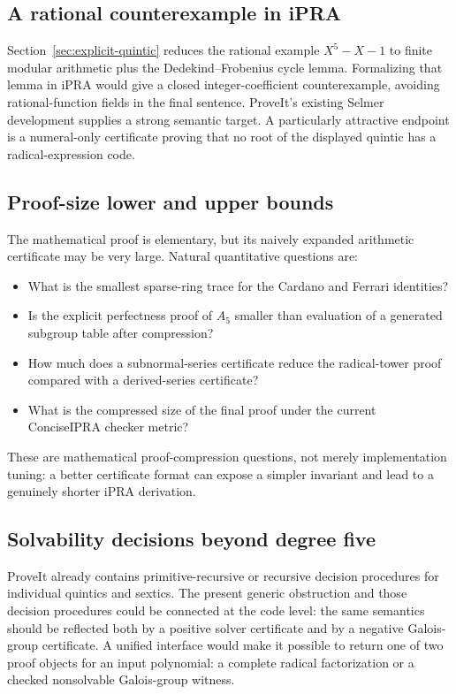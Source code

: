 \subsection{A rational counterexample in iPRA}

Section~\ref{sec:explicit-quintic} reduces the rational example
$X^5-X-1$ to finite modular arithmetic plus the Dedekind--Frobenius cycle
lemma.  Formalizing that lemma in iPRA would give a closed integer-coefficient
counterexample, avoiding rational-function fields in the final sentence.
ProveIt's existing Selmer development supplies a strong semantic target.  A
particularly attractive endpoint is a numeral-only certificate proving that
no root of the displayed quintic has a radical-expression code.

\subsection{Proof-size lower and upper bounds}

The mathematical proof is elementary, but its naively expanded arithmetic
certificate may be very large.  Natural quantitative questions are:

\begin{itemize}
\item What is the smallest sparse-ring trace for the Cardano and Ferrari
  identities?
\item Is the explicit perfectness proof of $A_5$ smaller than evaluation of a
  generated subgroup table after compression?
\item How much does a subnormal-series certificate reduce the radical-tower
  proof compared with a derived-series certificate?
\item What is the compressed size of the final proof under the current
  ConciseIPRA checker metric?
\end{itemize}

These are mathematical proof-compression questions, not merely implementation
tuning: a better certificate format can expose a simpler invariant and lead to
a genuinely shorter iPRA derivation.

\subsection{Solvability decisions beyond degree five}

ProveIt already contains primitive-recursive or recursive decision procedures
for individual quintics and sextics.  The present generic obstruction and
those decision procedures could be connected at the code level: the same
 semantics should be reflected both by a positive
solver certificate and by a negative Galois-group certificate.  A unified
interface would make it possible to return one of two proof objects for an
input polynomial: a complete radical factorization or a checked nonsolvable
Galois-group witness.
